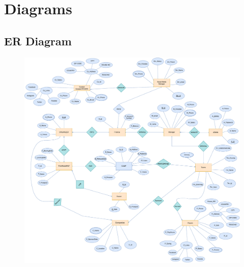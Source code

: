 \chapter{Diagrams}
\hrulefill


\section{ER Diagram}
\begin{figure}[h]
    \centering
    \vspace{2cm}
    \includegraphics[width=1.1\textwidth]{diagrams/Diagram-ERD.drawio.pdf}
    \label{fig:ER Diagram}
\end{figure}

\clearpage
